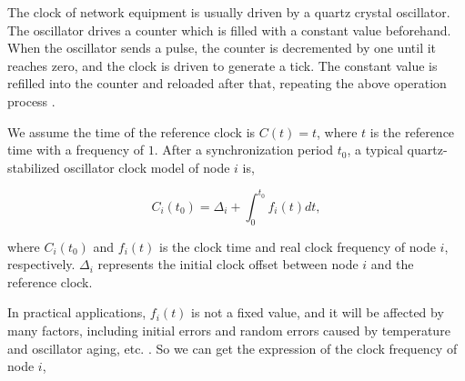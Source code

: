\documentclass[conference]{IEEEtran}
\begin{document}
The clock of network equipment is usually driven by a quartz crystal oscillator. The oscillator drives a counter which is filled with a constant value beforehand. When the oscillator sends a pulse, the counter is decremented by one until it reaches zero, and the clock is driven to generate a tick. The constant value is refilled into the counter and reloaded after that, repeating the above operation process \cite{ref12}.

We assume the time of the reference clock is $C(t)=t$, where $t$ is the reference time with a frequency of $1$. After a synchronization period $t_0$, a typical quartz-stabilized oscillator clock model of node $i$ is,

\begin{equation}
C_i(t_0) = \Delta_i  + \int_0^{t_0} {f_i(t)dt}, \label {eq1}
\end{equation}

\noindent where $C_i(t_0)$ and $f_i(t)$ is the clock time and real clock frequency of node $i$, respectively. $\Delta_i$ represents the initial clock offset between node $i$ and the reference clock.

In practical applications, $f_i(t)$ is not a fixed value, and it will be affected by many factors, including initial errors and random errors caused by temperature and oscillator aging, etc. \cite{ref4, ref27}. So we can get the expression of the clock frequency of node $i$, %


\end{document}
